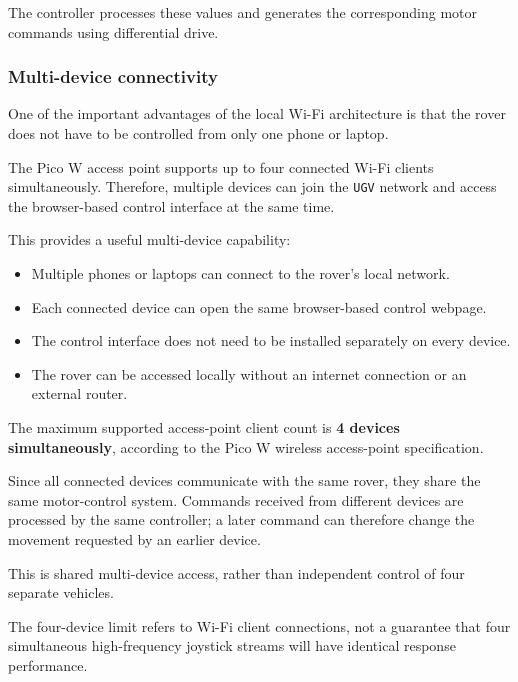 \documentclass[11pt,a4paper]{article}
\begin{document}
The controller processes these values and generates
the corresponding motor commands using differential
drive.


\subsubsection{Multi-device connectivity}

One of the important advantages of the local Wi-Fi
architecture is that the rover does not have to be
controlled from only one phone or laptop.

The Pico W access point supports up to four connected
Wi-Fi clients simultaneously. Therefore, multiple
devices can join the \texttt{UGV} network and access
the browser-based control interface at the same time.

This provides a useful multi-device capability:

\begin{itemize}

    \item Multiple phones or laptops can connect to
    the rover's local network.

    \item Each connected device can open the same
    browser-based control webpage.

    \item The control interface does not need to be
    installed separately on every device.

    \item The rover can be accessed locally without
    an internet connection or an external router.

\end{itemize}

The maximum supported access-point client count is
\textbf{4 devices simultaneously}, according to the
Pico W wireless access-point specification.

Since all connected devices communicate with the
same rover, they share the same motor-control system.
Commands received from different devices are processed
by the same controller; a later command can therefore
change the movement requested by an earlier device.

This is shared multi-device access, rather than
independent control of four separate vehicles.

The four-device limit refers to Wi-Fi client
connections, not a guarantee that four simultaneous
high-frequency joystick streams will have identical
response performance.
\end{document}
